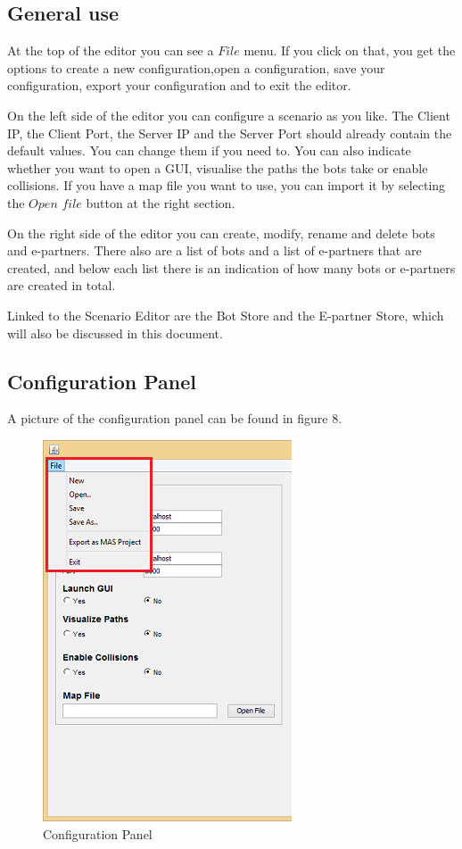 \documentclass[11pt,a4paper]{article}
\begin{document}
\subsection{General use}
At the top of the editor you can see a $File$ menu. If you click on that, you get the options to create a new configuration,open a configuration, save your configuration, export your configuration and to exit the editor.

On the left side of the editor you can configure a scenario as you like. The Client IP, the Client Port, the Server IP and the Server Port should already contain the default values. You can change them if you need to. You can also indicate whether you want to open a GUI, visualise the paths the bots take or enable collisions. If you have a map file you want to use, you can import it by selecting the $Open$ $file$ button at the right section.

On the right side of the editor you can create, modify, rename and delete bots and e-partners. There also are a list of bots and a list of e-partners that are created, and below each list there is an indication of how many bots or e-partners are created in total.

Linked to the Scenario Editor are the Bot Store and the E-partner Store, which will also be discussed in this document.
\pagebreak
\subsection{Configuration Panel}
A picture of the configuration panel can be found in figure 8.
\begin{figure}[h]
\begin{center}
\includegraphics{config.png}
\end{center}
\caption{Configuration Panel}
\end{figure}
\end{document}
